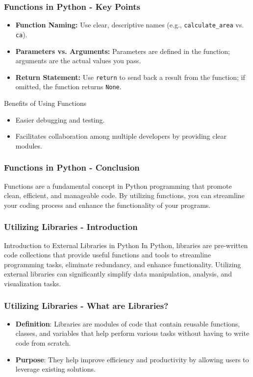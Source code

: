 \documentclass{beamer}
\begin{document}
\begin{frame}
    \frametitle{Functions in Python - Key Points}
    \begin{itemize}
        \item \textbf{Function Naming:} Use clear, descriptive names (e.g., \texttt{calculate\_area} vs. \texttt{ca}).
        \item \textbf{Parameters vs. Arguments:} Parameters are defined in the function; arguments are the actual values you pass.
        \item \textbf{Return Statement:} Use \texttt{return} to send back a result from the function; if omitted, the function returns \texttt{None}.
    \end{itemize}
    
    \begin{block}{Benefits of Using Functions}
        \begin{itemize}
            \item Easier debugging and testing.
            \item Facilitates collaboration among multiple developers by providing clear modules.
        \end{itemize}
    \end{block}
\end{frame}

\begin{frame}
    \frametitle{Functions in Python - Conclusion}
    Functions are a fundamental concept in Python programming that promote clean, efficient, and manageable code. By utilizing functions, you can streamline your coding process and enhance the functionality of your programs.
\end{frame}

\begin{frame}[fragile]
    \frametitle{Utilizing Libraries - Introduction}
    \begin{block}{Introduction to External Libraries in Python}
        In Python, libraries are pre-written code collections that provide useful functions and tools to streamline programming tasks, 
        eliminate redundancy, and enhance functionality. Utilizing external libraries can significantly simplify data manipulation, 
        analysis, and visualization tasks.
    \end{block}
\end{frame}

\begin{frame}[fragile]
    \frametitle{Utilizing Libraries - What are Libraries?}
    \begin{itemize}
        \item \textbf{Definition}: Libraries are modules of code that contain reusable functions, classes, and variables that help perform various tasks without having to write code from scratch.
        \item \textbf{Purpose}: They help improve efficiency and productivity by allowing users to leverage existing solutions.
    \end{itemize}
\end{frame}
\end{document}
